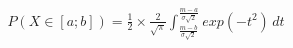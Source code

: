 \documentclass[preview]{standalone}
\begin{document}
\begin{align*}
P( X \in [a;b] ) = { \frac{1}{2} } \times { \frac{2}{\sqrt{\pi}} } \int_{ \frac{m - b}{\sigma \sqrt{2}} }^{ \frac{m - a}{\sigma \sqrt{2}} } { exp( -t^2 ) } \, dt
\end{align*}
\end{document}
